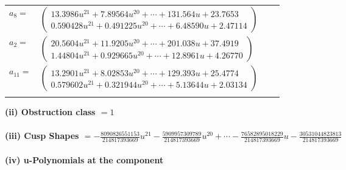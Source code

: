 \documentclass[1p]{elsarticle_modified}
\theoremstyle{definition}
\begin{document}
\begin{tabular}{m{7pt} m{180pt} m{7pt} m{180pt} }
\flushright $a_{8}=$&$\begin{pmatrix}13.3986 u^{21}+7.89564 u^{20}+\cdots+131.564 u+23.7653\\0.590428 u^{21}+0.491225 u^{20}+\cdots+6.48590 u+2.47114\end{pmatrix}$ \\
\flushright $a_{2}=$&$\begin{pmatrix}20.5604 u^{21}+11.9205 u^{20}+\cdots+201.038 u+37.4919\\1.44804 u^{21}+0.929665 u^{20}+\cdots+12.8961 u+4.26770\end{pmatrix}$ \\
\flushright $a_{11}=$&$\begin{pmatrix}13.2901 u^{21}+8.02853 u^{20}+\cdots+129.393 u+25.4774\\0.579602 u^{21}+0.321944 u^{20}+\cdots+5.13644 u+2.03134\end{pmatrix}$\\&\end{tabular}
\flushleft \textbf{(ii) Obstruction class $= 1$}\\~\\
\flushleft \textbf{(iii) Cusp Shapes $= -\frac{8090826551153}{214817393669} u^{21}-\frac{5909957309789}{214817393669} u^{20}+\cdots-\frac{76582895018229}{214817393669} u-\frac{30531044823813}{214817393669}$}\\~\\
\newpage\renewcommand{\arraystretch}{1}
\flushleft \textbf{(iv) u-Polynomials at the component}\newline \\
\end{document}
